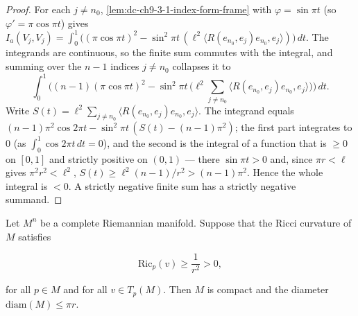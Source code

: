 \begin{proof}
  \leanok
  \sketch
  For each $j\ne n_0$, \cref{lem:dc-ch9-3-1-index-form-frame} with $\varphi=\sin\pi t$
  (so $\varphi'=\pi\cos\pi t$) gives
  $I_a(V_j,V_j)=\int_0^1\big((\pi\cos\pi t)^2-\sin^2\pi t\,(\ell^2\langle R(e_{n_0},e_j)e_{n_0},e_j\rangle)\big)\,dt$.
  The integrands are continuous, so the finite sum commutes with the integral, and summing over
  the $n-1$ indices $j\ne n_0$ collapses it to
  $$
  \int_0^1\Big((n-1)(\pi\cos\pi t)^2-\sin^2\pi t\,\big(\ell^2\textstyle\sum_{j\ne n_0}\langle R(e_{n_0},e_j)e_{n_0},e_j\rangle\big)\Big)\,dt.
  $$
  Write $S(t)=\ell^2\sum_{j\ne n_0}\langle R(e_{n_0},e_j)e_{n_0},e_j\rangle$. The integrand equals
  $(n-1)\pi^2\cos 2\pi t-\sin^2\pi t\,(S(t)-(n-1)\pi^2)$; the first part integrates to $0$
  (as $\int_0^1\cos 2\pi t\,dt=0$), and the second is the integral of a function that is $\ge 0$
  on $[0,1]$ and strictly positive on $(0,1)$ --- there $\sin\pi t>0$ and, since $\pi r<\ell$
  gives $\pi^2 r^2<\ell^2$, $S(t)\ge\ell^2(n-1)/r^2>(n-1)\pi^2$. Hence the whole integral is
  $<0$. A strictly negative finite sum has a strictly negative summand.
\end{proof}
\begin{theorem}
  \label{thm:dc-ch9-3-1}
  \notready
  Let $M^n$ be a complete Riemannian manifold. Suppose that the Ricci curvature of
  $M$ satisfies

  $$
  \mathrm{Ric}_p(v)\ge\frac{1}{r^2}>0,
  $$

  for all $p\in M$ and for all $v\in T_p(M)$. Then $M$ is compact and the diameter
  $\mathrm{diam}(M)\le\pi r$.
\end{theorem}
